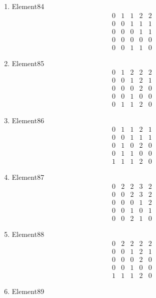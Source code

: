 \documentclass[12pt]{article}
\begin{document}
\begin{multicols}{3}
\begin{enumerate}
\item Element84
\begin{equation*}
\begin{array}{ccccc}
0&1&1&2&2\\
0&0&1&1&1\\
0&0&0&1&1\\
0&0&0&0&0\\
0&0&1&1&0
\end{array}
\end{equation*}
\item Element85
\begin{equation*}
\begin{array}{ccccc}
0&1&2&2&2\\
0&0&1&2&1\\
0&0&0&2&0\\
0&0&1&0&0\\
0&1&1&2&0
\end{array}
\end{equation*}
\item Element86
\begin{equation*}
\begin{array}{ccccc}
0&1&1&2&1\\
0&0&1&1&1\\
0&1&0&2&0\\
0&1&1&0&0\\
1&1&1&2&0
\end{array}
\end{equation*}
\item Element87
\begin{equation*}
\begin{array}{ccccc}
0&2&2&3&2\\
0&0&2&3&2\\
0&0&0&1&2\\
0&0&1&0&1\\
0&0&2&1&0
\end{array}
\end{equation*}
\item Element88
\begin{equation*}
\begin{array}{ccccc}
0&2&2&2&2\\
0&0&1&2&1\\
0&0&0&2&0\\
0&0&1&0&0\\
1&1&1&2&0
\end{array}
\end{equation*}
\item Element89
\begin{equation*}

\end{equation*}
\end{enumerate}
\end{multicols}
\end{document}
